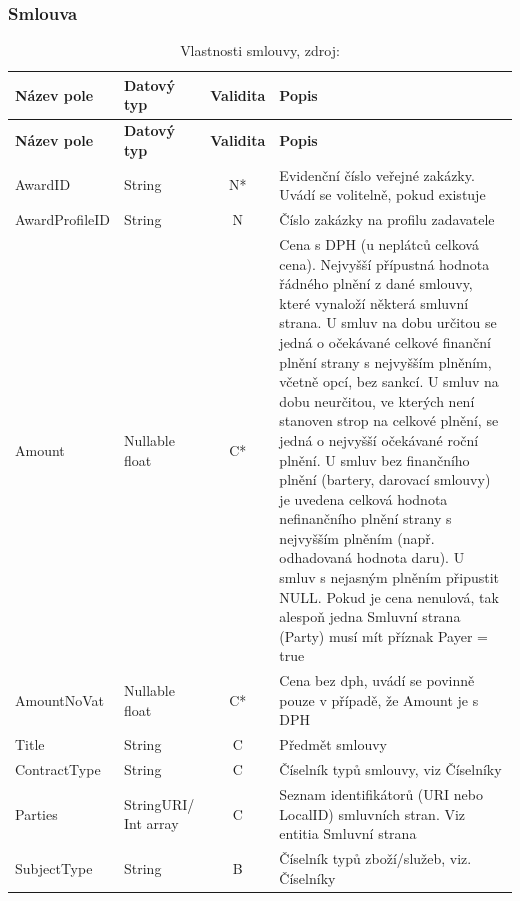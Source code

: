 \subsubsection*{Smlouva}

\begin{center}
\begin{longtable}{lp{20mm}cp{65mm}}
\label{grid_mlmmh} \\
\multicolumn{1}{l}{\textbf{Název pole}} & 
\multicolumn{1}{l}{\textbf{Datový typ}} & 
\multicolumn{1}{l}{\textbf{Validita}} & 
\multicolumn{1}{l}{\textbf{Popis}} \\ \hline 
\endfirsthead
\multicolumn{1}{l}{\textbf{Název pole}} & 
\multicolumn{1}{l}{\textbf{Datový typ}} & 
\multicolumn{1}{l}{\textbf{Validita}} & 
\multicolumn{1}{l}{\textbf{Popis}} \\ \hline 
\hline
\endhead
\endfoot
\caption{Vlastnosti smlouvy, zdroj:\protect\cite{metodika}}
\endlastfoot
AwardID & String & N* & Evidenční číslo veřejné zakázky. Uvádí se volitelně, pokud existuje \\
AwardProfileID & String & N & Číslo zakázky na profilu zadavatele \\
\rowcolor{validateC}Amount & Nullable float & C* & Cena s DPH (u neplátců celková cena). Nejvyšší přípustná hodnota řádného plnění z dané smlouvy, které vynaloží některá smluvní strana. U smluv na dobu určitou se jedná o očekávané celkové finanční plnění strany s nejvyšším plněním, včetně opcí, bez sankcí. U smluv na dobu neurčitou, ve kterých není stanoven strop na celkové plnění, se jedná o nejvyšší očekávané roční plnění. U smluv bez finančního plnění (bartery, darovací smlouvy) je uvedena celková hodnota nefinančního plnění strany s nejvyšším plněním (např. odhadovaná hodnota daru). U smluv s nejasným plněním připustit NULL. Pokud je cena nenulová, tak alespoň jedna Smluvní strana (Party) musí mít příznak Payer = true \\
\rowcolor{validateC}AmountNoVat & Nullable float & C* & Cena bez dph, uvádí se povinně pouze v případě, že Amount je s DPH \\
\rowcolor{validateC}Title & String & C & Předmět smlouvy \\
\rowcolor{validateC}ContractType & String & C & Číselník typů smlouvy, viz Číselníky \\
\rowcolor{validateC}Parties & StringURI/ Int array & C & Seznam identifikátorů (URI nebo LocalID) smluvních stran. Viz entitia Smluvní strana \\
\rowcolor{validateB}SubjectType & String & B & Číselník typů zboží/služeb, viz. Číselníky \\

\end{longtable}
\end{center}
